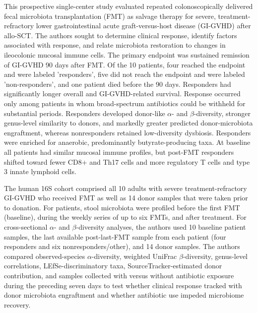 \documentclass[11pt,a4paper]{article}
\begin{document}
This prospective single-center study evaluated repeated colonoscopically delivered fecal microbiota transplantation (FMT) as salvage therapy for severe, treatment-refractory lower gastrointestinal acute graft-versus-host disease (GI-GVHD) after allo-SCT. The authors sought to determine clinical response, identify factors associated with response, and relate microbiota restoration to changes in ileocolonic mucosal immune cells. The primary endpoint was sustained remission of GI-GVHD 90 days after FMT. Of the 10 patients, four reached the endpoint and were labeled 'responders', five did not reach the endpoint and were labeled 'non-responders', and one patient died before the 90 days. Responders had significantly longer overall and GI-GVHD-related survival. Response occurred only among patients in whom broad-spectrum antibiotics could be withheld for substantial periods. Responders developed donor-like $\alpha$- and $\beta$-diversity, stronger genus-level similarity to donors, and markedly greater predicted donor-microbiota engraftment, whereas nonresponders retained low-diversity dysbiosis. Responders were enriched for anaerobic, predominantly butyrate-producing taxa. At baseline all patients had similar mucosal immune profiles, but post-FMT responders shifted toward fewer CD8+ and Th17 cells and more regulatory T cells and type 3 innate lymphoid cells.
\par

The human 16S cohort comprised all 10 adults with severe treatment-refractory GI-GVHD who received FMT as well as 14 donor samples that were taken prior to donation. For patients, stool microbiota were profiled before the first FMT (baseline), during the weekly series of up to six FMTs, and after treatment. For cross-sectional $\alpha$- and $\beta$-diversity analyses, the authors used 10 baseline patient samples, the last available post-last-FMT sample from each patient (four responders and six nonresponders/other), and 14 donor samples. The authors compared observed-species $\alpha$-diversity, weighted UniFrac $\beta$-diversity, genus-level correlations, LEfSe-discriminatory taxa, SourceTracker-estimated donor contribution, and samples collected with versus without antibiotic exposure during the preceding seven days to test whether clinical response tracked with donor microbiota engraftment and whether antibiotic use impeded microbiome recovery.
\par
\end{document}
